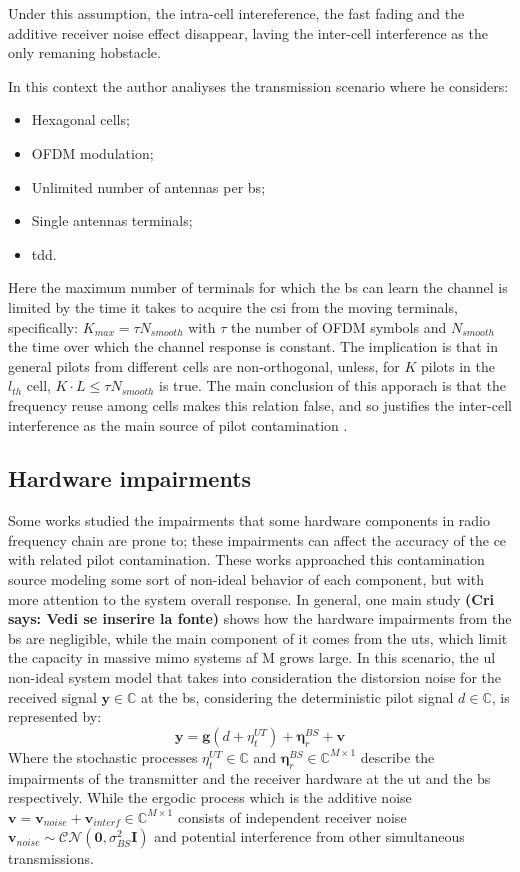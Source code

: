 \documentclass[11pt]{book}
\newcommand{\cri}[1]{\textcolor{MyColor2}{\textbf{(Cri says: #1)}}}
\begin{document}
Under this assumption, the intra-cell intereference, the fast fading and the additive receiver noise effect disappear, laving the inter-cell interference as the only remaning hobstacle.

In this context the author analiyses the transmission scenario where he considers:
\begin{itemize}
  \item Hexagonal cells;
  \item OFDM modulation;
  \item Unlimited number of antennas per \gls{bs};
  \item Single antennas terminals;
  \item \gls{tdd}.
\end{itemize}
Here the maximum number of terminals for which the \gls{bs} can learn the channel is limited by the time it takes to acquire the \gls{csi} from the moving terminals, specifically: $K_{max} = \tau N_{smooth}$ with $\tau$ the number of OFDM symbols and $N_{smooth}$ the time over which the channel response is constant. The implication is that in general pilots from different cells are non-orthogonal, unless, for $K$ pilots in the $l_{th}$ cell, $K\cdot L \leq \tau N_{smooth}$ is true. The main conclusion of this apporach is that the frequency reuse among cells makes this relation false, and so justifies the inter-cell interference as the main source of pilot contamination \cite{Marzetta2010}.
\subsection{Hardware impairments}
Some works studied the impairments that some hardware components in radio frequency chain are prone to; these impairments can affect the accuracy of the \gls{ce} with related pilot contamination. These works approached this contamination source modeling some sort of non-ideal behavior of each component, but with more attention to the system overall response. In general, one main study \cri{Vedi se inserire la fonte} shows how the hardware impairments from the \gls{bs} are negligible, while the main component of it comes from the \gls{ut}s, which limit the capacity in massive \gls{mimo} systems af M grows large. In this scenario, the \gls{ul} non-ideal system model that takes into consideration the distorsion noise for the received signal $\textbf{y} \in \mathbb{C}$ at the \gls{bs}, considering the deterministic pilot signal $d \in \mathbb{C}$, is represented by:
\begin{equation}
  \textbf{y} = \textbf{g}(d + {\eta}_t^{UT}) + \mathbf{\eta}_r^{BS} + \textbf{v}
\end{equation}
Where the stochastic processes $\eta_t^{UT} \in \mathbb{C}$ and $\mathbf{\eta}_r^{BS} \in \mathbb{C}^{M\times 1}$ describe the impairments of the transmitter and the receiver hardware at the \gls{ut} and the \gls{bs} respectively. While the ergodic process which is the additive noise $\textbf{v} = \textbf{v}_{noise} + \textbf{v}_{interf} \in \mathbb{C}^{M\times 1}$ consists of independent receiver noise $\textbf{v}_{noise} \sim \mathcal{CN}(\textbf{0},\sigma_{BS}^2\textbf{I})$ and potential interference from other simultaneous transmissions.
\end{document}
